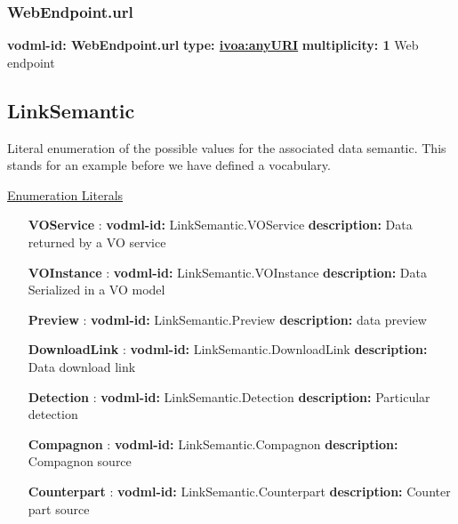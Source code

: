     \subsubsection{WebEndpoint.url}
      \textbf{vodml-id: WebEndpoint.url} \newline
      \textbf{type: \hyperref[sect:ivoa]{ivoa:anyURI}} \newline
      \textbf{multiplicity: 1} \newline 
      Web endpoint

  \subsection{LinkSemantic}
  \label{sect:LinkSemantic}

  Literal enumeration of the possible values for the associated data semantic. This stands for an example before we have defined a vocabulary.

  \noindent \underline{Enumeration Literals}
  \vspace{-\parsep}
  \small
  \begin{itemize}
  
    \item[\textbf{VOService}]: \textbf{vodml-id:} LinkSemantic.VOService \newline
          \textbf{description:} Data returned by a VO service
    \item[\textbf{VOInstance}]: \textbf{vodml-id:} LinkSemantic.VOInstance \newline
          \textbf{description:} Data Serialized in a VO model
    \item[\textbf{Preview}]: \textbf{vodml-id:} LinkSemantic.Preview \newline
          \textbf{description:} data preview
    \item[\textbf{DownloadLink}]: \textbf{vodml-id:} LinkSemantic.DownloadLink \newline
          \textbf{description:} Data download link
    \item[\textbf{Detection}]: \textbf{vodml-id:} LinkSemantic.Detection \newline
          \textbf{description:} Particular detection
    \item[\textbf{Compagnon}]: \textbf{vodml-id:} LinkSemantic.Compagnon \newline
          \textbf{description:} Compagnon source
    \item[\textbf{Counterpart}]: \textbf{vodml-id:} LinkSemantic.Counterpart \newline
          \textbf{description:} Counter part source
  \end{itemize}
  \normalsize


